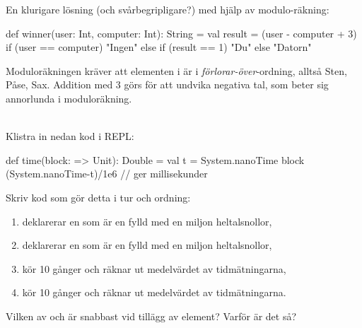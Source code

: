 En klurigare lösning (och svårbegripligare?) med hjälp av modulo-räkning:

\begin{Code}
  def winner(user: Int, computer: Int): String = {
     val result = (user - computer + 3) %
     if (user == computer) "Ingen"
     else if (result == 1) "Du"
     else "Datorn"
  }
\end{Code}
Moduloräkningen kräver att elementen i  är i \emph{förlorar-över}-ordning, alltså Sten, Påse, Sax. Addition med 3 görs för att undvika negativa tal, som beter sig annorlunda i moduloräkning.

\QUESTEND




\QUESTBEGIN

\Task\Uberkurs \what~\\
Klistra in nedan kod i REPL:
\begin{Code}
def time(block: => Unit): Double = {
  val t = System.nanoTime
  block
  (System.nanoTime-t)/1e6  // ger millisekunder
}
\end{Code}

\Subtask Skriv kod som gör detta i tur och ordning:
\begin{enumerate}
  \item deklarerar en  som är en  fylld med en miljon heltalsnollor,
  \item deklarerar en  som är en  fylld med en miljon heltalsnollor,
  \item kör  10 gånger och räknar ut medelvärdet av tidmätningarna,
  \item kör  10 gånger och räknar ut medelvärdet av tidmätningarna.
\end{enumerate}

\Subtask Vilken av  och  är snabbast vid tillägg av element? Varför är det så?

\SOLUTION

\TaskSolved \what~


